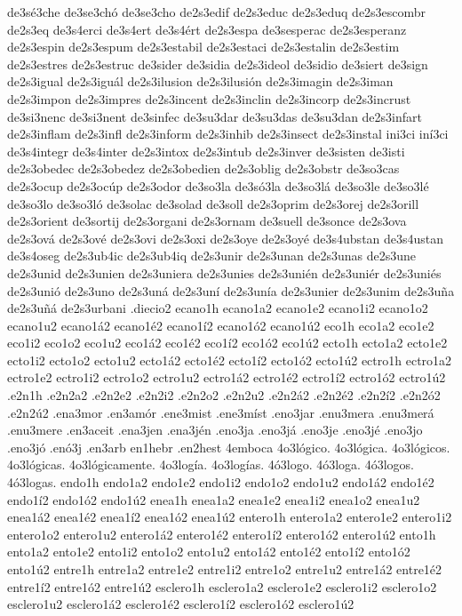 {de3sé3che
de3se3chó
de3se3cho
de2s3edif
de2s3educ
de2s3eduq
de2s3escombr
de2s3eq
de3s4erci
de3s4ert
de3s4ért
de2s3espa
de3sesperac
de2s3esperanz
de2s3espin
de2s3espum
de2s3estabil
de2s3estaci
de2s3estalin
de2s3estim
de2s3estres
de2s3estruc
de3sider
de3sidia
de2s3ideol
de3sidio
de3siert
de3sign
de2s3igual
de2s3iguál
de2s3ilusion
de2s3ilusión
de2s3imagin
de2s3iman
de2s3impon
de2s3impres
de2s3incent
de2s3inclin
de2s3incorp
de2s3incrust
de3si3nenc
de3si3nent
de3sinfec
de3su3dar
de3su3das
de3su3dan
de2s3infart
de2s3inflam
de2s3infl
de2s3inform
de2s3inhib
de2s3insect
de2s3instal
ini3ci
iní3ci
de3s4integr
de3s4inter
de2s3intox
de2s3intub
de2s3inver
de3sisten
de3isti
de2s3obedec
de2s3obedez
de2s3obedien
de2s3oblig
de2s3obstr
de3so3cas
de2s3ocup
de2s3ocúp
de2s3odor
de3so3la
de3só3la
de3so3lá
de3so3le
de3so3lé
de3so3lo
de3so3ló
de3solac
de3solad
de3soll
de2s3oprim
de2s3orej
de2s3orill
de2s3orient
de3sortij
de2s3organi
de2s3ornam
de3suell
de3sonce
de2s3ova
de2s3ová
de2s3ové
de2s3ovi
de2s3oxi
de2s3oye
de2s3oyé
de3s4ubstan
de3s4ustan
de3s4oseg
de2s3ub4ic
de2s3ub4iq
de2s3unir
de2s3unan
de2s3unas
de2s3une
de2s3unid
de2s3unien
de2s3uniera
de2s3unies
de2s3unién
de2s3uniér
de2s3uniés
de2s3unió
de2s3uno
de2s3uná
de2s3uní
de2s3unía
de2s3unier
de2s3unim
de2s3uña
de2s3uñá
de2s3urbani
.diecio2
ecano1h
ecano1a2 ecano1e2 ecano1i2 ecano1o2 ecano1u2
ecano1á2 ecano1é2 ecano1í2 ecano1ó2 ecano1ú2
eco1h
eco1a2 eco1e2 eco1i2 eco1o2 eco1u2
eco1á2 eco1é2 eco1í2 eco1ó2 eco1ú2
ecto1h
ecto1a2 ecto1e2 ecto1i2 ecto1o2 ecto1u2
ecto1á2 ecto1é2 ecto1í2 ecto1ó2 ecto1ú2
ectro1h
ectro1a2 ectro1e2 ectro1i2 ectro1o2 ectro1u2
ectro1á2 ectro1é2 ectro1í2 ectro1ó2 ectro1ú2
.e2n1h
.e2n2a2 .e2n2e2 .e2n2i2 .e2n2o2 .e2n2u2
.e2n2á2 .e2n2é2 .e2n2í2 .e2n2ó2 .e2n2ú2
.ena3mor
.en3amór
.ene3mist
.ene3míst
.eno3jar
.enu3mera
.enu3merá
.enu3mere
.en3aceit
.ena3jen
.ena3jén
.eno3ja
.eno3já
.eno3je
.eno3jé
.eno3jo
.eno3jó
.enó3j
.en3arb
en1hebr
.en2hest
4emboca
4o3lógico.
4o3lógica.
4o3lógicos.
4o3lógicas.
4o3lógicamente.
4o3logía.
4o3logías.
4ó3logo.
4ó3loga.
4ó3logos.
4ó3logas.
endo1h
endo1a2 endo1e2 endo1i2 endo1o2 endo1u2
endo1á2 endo1é2 endo1í2 endo1ó2 endo1ú2
enea1h
enea1a2 enea1e2 enea1i2 enea1o2 enea1u2
enea1á2 enea1é2 enea1í2 enea1ó2 enea1ú2
entero1h
entero1a2 entero1e2 entero1i2 entero1o2 entero1u2
entero1á2 entero1é2 entero1í2 entero1ó2 entero1ú2
ento1h
ento1a2 ento1e2 ento1i2 ento1o2 ento1u2
ento1á2 ento1é2 ento1í2 ento1ó2 ento1ú2
entre1h
entre1a2 entre1e2 entre1i2 entre1o2 entre1u2
entre1á2 entre1é2 entre1í2 entre1ó2 entre1ú2
esclero1h
esclero1a2 esclero1e2 esclero1i2 esclero1o2 esclero1u2
esclero1á2 esclero1é2 esclero1í2 esclero1ó2 esclero1ú2
}

